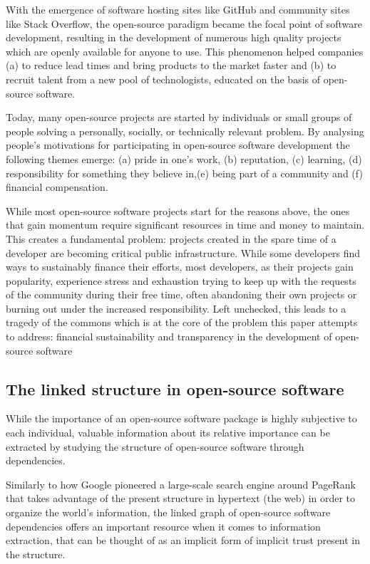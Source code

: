 With the emergence of software hosting sites like GitHub and community sites
like Stack Overflow, the open-source paradigm became the focal point of
software development, resulting in the development of numerous high quality
projects which are openly available for anyone to use. This phenomenon helped
companies (a) to reduce lead times and bring products to the market faster and
(b) to recruit talent from a new pool of technologists, educated on the basis
of open-source software.

Today, many open-source projects are started by individuals or small groups of
people solving a personally, socially, or technically relevant problem. By
analysing people's motivations for participating in open-source software
development the following themes emerge: (a) pride in one's work, (b)
reputation, (c) learning, (d) responsibility for something they believe in,(e)
being part of a community and (f) financial compensation.

While most open-source software projects start for the reasons above, the ones
that gain momentum require significant resources in time and money to maintain.
This creates a fundamental problem: projects created in the spare time of a
developer are becoming critical public infrastructure. While some developers
find ways to sustainably finance their efforts, most developers, as their
projects gain popularity, experience stress and exhaustion trying to keep up
with the requests of the community during their free time, often abandoning
their own projects or burning out under the increased responsibility. Left
unchecked, this leads to a tragedy of the commons which is at the core of the
problem this paper attempts to address: financial sustainability and
transparency in the development of open-source software


\subsection{The linked structure in open-source software}

While the importance of an open-source software package is highly subjective to
each individual, valuable information about its relative importance can be
extracted by studying the structure of open-source software through
dependencies.

Similarly to how Google pioneered a large-scale search engine around PageRank
that takes advantage of the present structure in hypertext (the web) in order
to organize the world’s information, the linked graph of open-source software
dependencies offers an important resource when it comes to information
extraction, that can be thought of as an implicit form of implicit trust
present in the structure.

